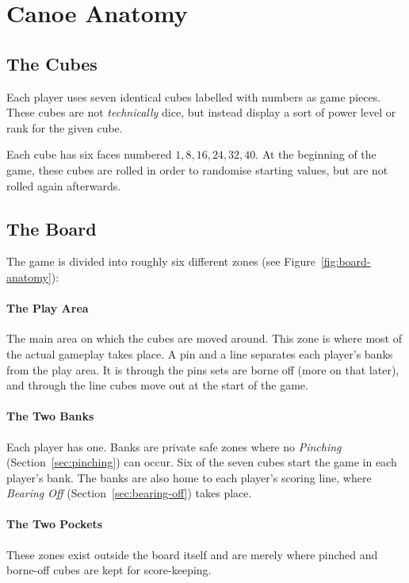 \section{Canoe Anatomy}
\subsection{The Cubes}
Each player uses seven identical cubes labelled with numbers as game pieces.
These cubes are not \textit{technically} dice, but instead display a sort of power level or rank for the given cube.

Each cube has six faces numbered $1, 8, 16, 24, 32, 40$. 
At the beginning of the game, these cubes are rolled in order to randomise starting values, but are not rolled again afterwards.
\subsection{The Board}
The game is divided into roughly six different zones (see Figure~\ref{fig:board-anatomy}):
\paragraph{The Play Area} The main area on which the cubes are moved around. 
This zone is where most of the actual gameplay takes place.
A pin and a line separates each player's banks from the play area.
It is through the pins sets are borne off (more on that later), and through the line cubes move out at the start of the game.
\paragraph{The Two Banks} Each player has one. Banks are private safe zones where no \textit{Pinching} (Section~\ref{sec:pinching}) can occur. Six of the seven cubes start the game in each player's bank.
The banks are also home to each player's scoring line, where \textit{Bearing Off} (Section~\ref{sec:bearing-off}) takes place.
\paragraph{The Two Pockets} These zones exist outside the board itself and are merely where pinched and borne-off cubes are kept for score-keeping.

